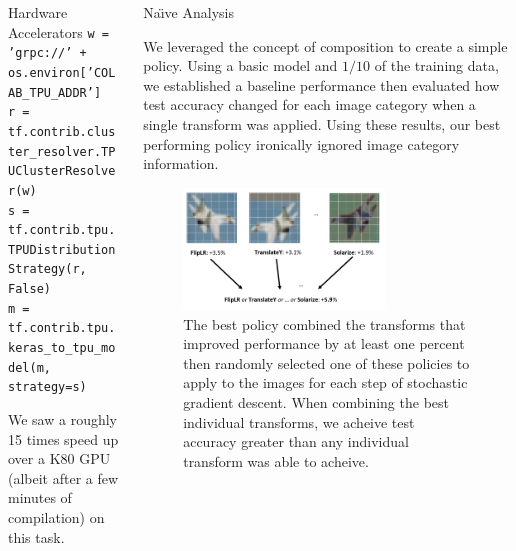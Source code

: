 \documentclass[final]{beamer}
\newlength{\onecolwid}
\begin{document}
\begin{frame}[t]
\begin{columns}[t]
\begin{column}{\onecolwid}
\begin{block}{Hardware Accelerators}
  {\small
    \texttt{w = 'grpc://' + os.environ['COLAB\_TPU\_ADDR']} \\
    \texttt{r = tf.contrib.cluster\_resolver.TPUClusterResolver(w)} \\
    \texttt{s = tf.contrib.tpu.TPUDistributionStrategy(r, False)} \\
    \texttt{m = tf.contrib.tpu.keras\_to\_tpu\_model(m, strategy=s)}
  }

  We saw a roughly 15 times speed up over a K80 GPU (albeit after a few minutes of compilation) on this task. 


\end{block}

\end{column} %

\begin{column}{\onecolwid} %

\begin{block}{Na\"{\i}ve Analysis}

 We leveraged the concept of composition to create a simple policy. Using a basic model and $1/10$ of the training data, we established a baseline performance then evaluated how test accuracy changed for each image category when a single transform was applied. Using these results, our best performing policy ironically ignored image category information. 

 \begin{figure}
 	\centering
 	\includegraphics[width=0.70\textwidth]{naive_analysis.png}
 	\caption{
 		The best policy combined the transforms that improved performance by at least one percent then randomly selected one of these policies to apply to the images for each step of stochastic gradient descent. When combining the best individual transforms, we acheive test accuracy greater than any individual transform was able to acheive.} 
 	\label{fig:niave_analysis}
  \end{figure}


\end{block}
\end{column}
\end{columns}
\end{frame}
\end{document}
